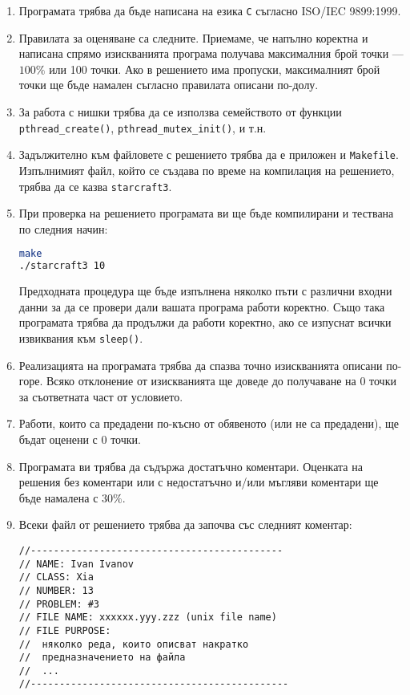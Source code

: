 \documentclass[a4paper,10pt]{article}
\begin{document}
		\begin{enumerate}
			\item Програмата трябва да бъде написана на езика \verb|C| съгласно ISO/IEC 9899:1999.

			\item Правилата за оценяване са следните. Приемаме, че напълно коректна и написана спрямо изискванията програма 
			получава максималния брой точки — $100\%$ или 100 точки. Ако в решението има пропуски, максималният брой точки ще 
			бъде намален съгласно правилата описани по-долу.

			\item За работа с нишки трябва да се използва семейството от функции \verb|pthread_create()|, \verb|pthread_mutex_init()|, и т.н. \item Задължително към файловете с решението трябва да е приложен и
			\verb|Makefile|. Изпълнимият файл, който се създава по време на компилация на решението, трябва да се казва
			\verb|starcraft3|.

			\item При проверка на решението програмата ви ще бъде компилирани и тествана по следния начин:
				\begin{lstlisting}[language=bash]
make
./starcraft3 10
				\end{lstlisting}
				
				Предходната процедура ще бъде изпълнена няколко пъти с различни входни данни за да се провери дали вашата програма работи коректно. Също така програмата трябва да продължи да работи коректно, ако се изпуснат всички извиквания към \verb|sleep()|.

			\item Реализацията на програмата трябва да спазва точно изискванията описани по-горе. Всяко отклонение от 
			изискванията ще доведе до получаване на 0 точки за съответната част от условието.
			
			\item Работи, които са предадени по-късно от обявеното (или не са предадени), ще бъдат оценени с 0 точки.
			
			\item Програмата ви трябва да съдържа достатъчно коментари. Оценката на решения без коментари или с недостатъчно 
			и/или мъгляви коментари ще бъде намалена с $30\%$.
			
			\item Всеки файл от решението трябва да започва със следният коментар:

				\begin{verbatim}
//--------------------------------------------
// NAME: Ivan Ivanov
// CLASS: Xia
// NUMBER: 13
// PROBLEM: #3
// FILE NAME: xxxxxx.yyy.zzz (unix file name)
// FILE PURPOSE:
// 	няколко реда, които описват накратко
// 	предназначението на файла
// 	...
//--------------------------------------------- 
				\end{verbatim}
	

\end{enumerate}
\end{document}
